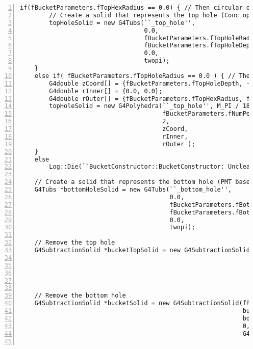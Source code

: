 \documentclass[11pt]{article}
\begin{document}
\begin{Verbatim}[gobble=0,numbers=left]
    if(fBucketParameters.fTopHexRadius == 0.0) { // Then circular opening
        // Create a solid that represents the top hole (Conc opening)
        topHoleSolid = new G4Tubs(``_top_hole'',
                                  0.0,
                                  fBucketParameters.fTopHoleRadius,
                                  fBucketParameters.fTopHoleDepth,
                                  0.0,
                                  twopi);
    }
    else if( fBucketParameters.fTopHoleRadius == 0.0 ) { // Then hex opening
        G4double zCoord[] = {fBucketParameters.fTopHoleDepth, -fBucketParameters.fTopHoleDepth};
        G4double rInner[] = {0.0, 0.0};
        G4double rOuter[] = {fBucketParameters.fTopHexRadius, fBucketParameters.fTopHexRadius};
        topHoleSolid = new G4Polyhedra(``_top_hole'', M_PI / 18.0 * rad, twopi,
                                       fBucketParameters.fNumPetals,
                                       2,
                                       zCoord,
                                       rInner,
                                       rOuter );
    }
    else
        Log::Die(``BucketConstructor::BucketConstructor: Unclear top opening type.'');

    // Create a solid that represents the bottom hole (PMT base opening)
    G4Tubs *bottomHoleSolid = new G4Tubs(``_bottom_hole'',
                                         0.0,
                                         fBucketParameters.fBottomHoleRadius,
                                         fBucketParameters.fBottomHoleDepth,
                                         0.0,
                                         twopi);

    // Remove the top hole
    G4SubtractionSolid *bucketTopSolid = new G4SubtractionSolid(``_top_temp'',
                                                                bucketOuter,
                                                                topHoleSolid,
                                                                0,
                                                                G4ThreeVector (0, 0, fBucketParameters.fEdgeZCoord.front()));

    // Remove the bottom hole
    G4SubtractionSolid *bucketSolid = new G4SubtractionSolid(fPrefix + ``_solid'',
                                                             bucketTopSolid,
                                                             bottomHoleSolid,
                                                             0,
                                                             G4ThreeVector (0, 0, fBucketParameters.fEdgeZCoord.back()));


\end{Verbatim}
\end{document}
